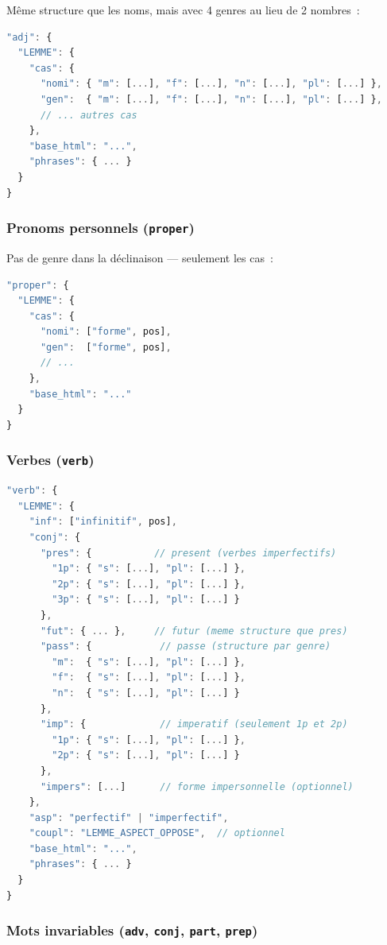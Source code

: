 Même structure que les noms, mais avec 4 genres au lieu de 2 nombres~:

\begin{lstlisting}[language=javascript]
"adj": {
  "LEMME": {
    "cas": {
      "nomi": { "m": [...], "f": [...], "n": [...], "pl": [...] },
      "gen":  { "m": [...], "f": [...], "n": [...], "pl": [...] },
      // ... autres cas
    },
    "base_html": "...",
    "phrases": { ... }
  }
}
\end{lstlisting}

\subsubsection{Pronoms personnels (\texttt{proper})}

Pas de genre dans la déclinaison --- seulement les cas~:

\begin{lstlisting}[language=javascript]
"proper": {
  "LEMME": {
    "cas": {
      "nomi": ["forme", pos],
      "gen":  ["forme", pos],
      // ...
    },
    "base_html": "..."
  }
}
\end{lstlisting}

\subsubsection{Verbes (\texttt{verb})}

\begin{lstlisting}[language=javascript]
"verb": {
  "LEMME": {
    "inf": ["infinitif", pos],
    "conj": {
      "pres": {           // present (verbes imperfectifs)
        "1p": { "s": [...], "pl": [...] },
        "2p": { "s": [...], "pl": [...] },
        "3p": { "s": [...], "pl": [...] }
      },
      "fut": { ... },     // futur (meme structure que pres)
      "pass": {            // passe (structure par genre)
        "m":  { "s": [...], "pl": [...] },
        "f":  { "s": [...], "pl": [...] },
        "n":  { "s": [...], "pl": [...] }
      },
      "imp": {             // imperatif (seulement 1p et 2p)
        "1p": { "s": [...], "pl": [...] },
        "2p": { "s": [...], "pl": [...] }
      },
      "impers": [...]      // forme impersonnelle (optionnel)
    },
    "asp": "perfectif" | "imperfectif",
    "coupl": "LEMME_ASPECT_OPPOSE",  // optionnel
    "base_html": "...",
    "phrases": { ... }
  }
}
\end{lstlisting}

\subsubsection{Mots invariables (\texttt{adv}, \texttt{conj}, \texttt{part}, \texttt{prep})}

